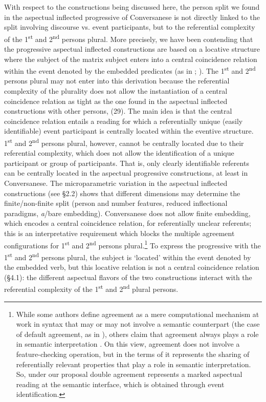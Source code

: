 \documentclass[output=paper]{langsci/langscibook}
\begin{document}
With respect to the constructions being discussed here, the person split we found in the aspectual inflected progressive of Conversanese is not directly linked to the split involving discourse vs. event participants, but to the referential complexity of the 1\textsuperscript{st} and 2\textsuperscript{nd} persons plural. More precisely, we have been contending that the progressive aspectual inflected constructions are based on a locative structure where the subject of the matrix subject enters into a central coincidence relation within the event denoted by the embedded predicates (as in \citealt{Mateu1999}; \citealt{Laka2006}). The 1\textsuperscript{st} and 2\textsuperscript{nd} persons plural may not enter into this derivation because the referential complexity of the plurality does not allow the instantiation of a central coincidence relation as tight as the one found in the aspectual inflected constructions with other persons, (29). The main idea is that the central coincidence relation entails a reading for which a referentially unique (easily identifiable) event participant is centrally located within the eventive structure. 1\textsuperscript{st} and 2\textsuperscript{nd} persons plural, however, cannot be centrally located due to their referential complexity, which does not allow the identification of a unique participant or group of participants. That is, only clearly identifiable referents can be centrally located in the aspectual progressive constructions, at least in Conversanese. The microparametric variation in the aspectual inflected constructions (see §2.2) shows that different dimensions may determine the finite/non-finite split (person and number features, reduced inflectional paradigms, \textit{a}/bare embedding). Conversanese does not allow finite embedding, which encodes a central coincidence relation, for referentially unclear referents; this is an interpretative requirement which blocks the multiple agreement configurations for 1\textsuperscript{st} and 2\textsuperscript{nd} persons plural.\footnote{While some authors define agreement as a mere computational mechanism at work in syntax that may or may not involve a semantic counterpart (the case of default agreement, as in \citealt{Preminger2014}), others claim that agreement always plays a role in semantic interpretation \citep{Manzini2007,Manzini2011}. On this view, agreement does not involve a feature{}-checking operation, but in the terms of \citet{Manzini2007} it represents the sharing of referentially relevant properties that play a role in semantic interpretation. So, under our proposal double agreement represents a marked aspectual reading at the semantic interface, which is obtained through event identification.} To express the progressive with the 1\textsuperscript{st} and 2\textsuperscript{nd} persons plural, the subject is ‘located’ within the event denoted by the embedded verb, but this locative relation is not a central coincidence relation (§4.1): the different aspectual flavors of the two constructions interact with the referential complexity of the 1\textsuperscript{st} and 2\textsuperscript{nd} plural persons.
\end{document}
